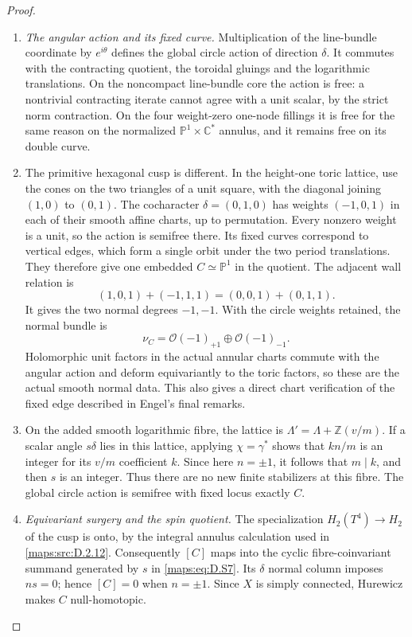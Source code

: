 \begin{proof}
\begin{enumerate}[label=\arabic*.,leftmargin=*]
\item \emph{The angular action and its fixed curve.}
Multiplication of the line-bundle coordinate by
$e^{i\theta}$ defines the global circle action of direction
$\delta$. It commutes with the contracting quotient,
the toroidal gluings and the logarithmic translations.
On the noncompact line-bundle core the action is free:
a nontrivial contracting iterate cannot agree with a unit
scalar, by the strict norm contraction. On the four
weight-zero one-node fillings it is free for the same
reason on the normalized $\mathbb P^1\times\mathbb C^*$
annulus, and it remains free on its double curve.

\item The primitive hexagonal cusp is different. In the height-one
toric lattice, use the cones on the two triangles of a unit
square, with the diagonal joining $(1,0)$ to $(0,1)$.
The cocharacter $\delta=(0,1,0)$ has weights $(-1,0,1)$
in each of their smooth affine charts, up to permutation.
Every nonzero weight is a unit, so the action is semifree
there. Its fixed curves correspond to vertical edges, which
form a single orbit under the two period translations.
They therefore give one embedded $C\simeq\mathbb P^1$
in the quotient. The adjacent wall relation is
\[
 (1,0,1)+(-1,1,1)=(0,0,1)+(0,1,1).
\]
It gives the two normal degrees $-1,-1$. With the circle
weights retained, the normal bundle is
\[
 \nu_C=\mathcal O(-1)_{+1}\oplus\mathcal O(-1)_{-1}.
 \tag{D.S11}\label{maps:eq:D.S11}
\]
Holomorphic unit factors in the actual annular charts
commute with the angular action and deform equivariantly
to the toric factors, so these are the actual smooth
normal data. This also gives a direct chart verification
of the fixed edge described in Engel's final remarks.

\item On the added smooth logarithmic fibre, the lattice is
$\Lambda'=\Lambda+\mathbb Z(v/m)$. If a scalar angle
$s\delta$ lies in this lattice, applying $\chi=\gamma^*$
shows that $kn/m$ is an integer for its $v/m$ coefficient
$k$. Since here $n=\pm1$, it follows that $m\mid k$,
and then $s$ is an integer. Thus there are no new finite
stabilizers at this fibre. The global circle action is
semifree with fixed locus exactly $C$.

\item \emph{Equivariant surgery and the spin quotient.}
The specialization $H_2(T^4)\to H_2$ of the cusp is onto,
by the integral annulus calculation used in \ref{maps:src:D.2.12}.
Consequently $[C]$ maps into the cyclic fibre-coinvariant
summand generated by $s$ in \eqref{maps:eq:D.S7}. Its $\delta$ normal
column imposes $ns=0$; hence $[C]=0$ when $n=\pm1$.
Since $X$ is simply connected, Hurewicz makes $C$
null-homotopic.


\end{enumerate}
\end{proof}
